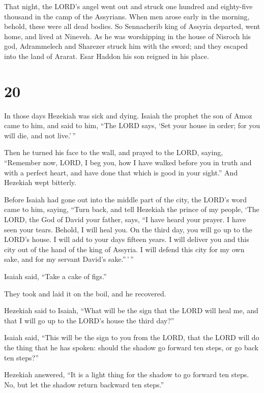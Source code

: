  That night, the LORD's angel went out and struck one
hundred and eighty-five thousand in the camp of the Assyrians. When men
arose early in the morning, behold, these were all dead bodies.
 So Sennacherib king of Assyria departed, went home, and
lived at Nineveh.  As he was worshipping in the house of
Nisroch his god, Adrammelech and Sharezer struck him with the sword; and
they escaped into the land of Ararat. Esar Haddon his son reigned in his
place.

\hypertarget{section-19}{%
\section{20}\label{section-19}}

 In those days Hezekiah was sick and dying. Isaiah the
prophet the son of Amoz came to him, and said to him, ``The LORD says,
`Set your house in order; for you will die, and not live.'\,''

 Then he turned his face to the wall, and prayed to the
LORD, saying,  ``Remember now, LORD, I beg you, how I have
walked before you in truth and with a perfect heart, and have done that
which is good in your sight.'' And Hezekiah wept bitterly.

 Before Isaiah had gone out into the middle part of the
city, the LORD's word came to him, saying,  ``Turn back, and
tell Hezekiah the prince of my people, `The LORD, the God of David your
father, says, ``I have heard your prayer. I have seen your tears.
Behold, I will heal you. On the third day, you will go up to the LORD's
house.  I will add to your days fifteen years. I will
deliver you and this city out of the hand of the king of Assyria. I will
defend this city for my own sake, and for my servant David's
sake.''\,'\,''

 Isaiah said, ``Take a cake of figs.''

They took and laid it on the boil, and he recovered.

 Hezekiah said to Isaiah, ``What will be the sign that the
LORD will heal me, and that I will go up to the LORD's house the third
day?''

 Isaiah said, ``This will be the sign to you from the LORD,
that the LORD will do the thing that he has spoken: should the shadow go
forward ten steps, or go back ten steps?''

 Hezekiah answered, ``It is a light thing for the shadow to
go forward ten steps. No, but let the shadow return backward ten
steps.''

